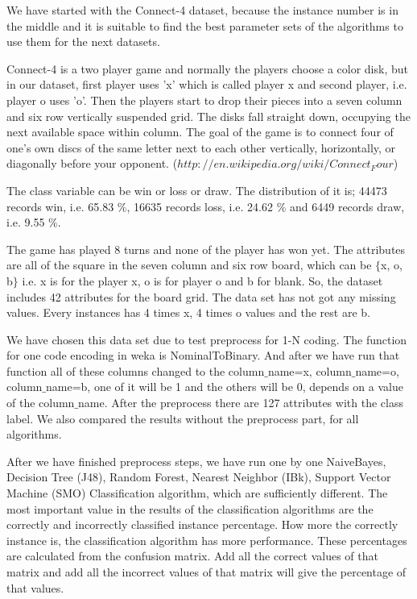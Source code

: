 \documentclass[a4paper]{article}
\begin{document}
We have started with the Connect-4 dataset, because the instance number is in the middle and it is suitable to find the best parameter sets of the algorithms to use them for the next datasets.

Connect-4 is a two player game and normally the players choose a color disk, but in our dataset, first player uses 'x' which is called player x and second player, i.e. player o uses 'o'. Then the players start to drop their pieces into a seven column and six row vertically suspended grid. The disks fall straight down, occupying the next available space within column. The goal of the game is to connect four of one's own discs of the same letter next to each other vertically, horizontally, or diagonally before your opponent. ($http://en.wikipedia.org/wiki/Connect_Four$) 

The class variable can be win or loss or draw. The distribution of it is; 44473 records win, i.e. 65.83 $\%$, 16635 records loss,  i.e. 24.62 $\%$ and 6449 records draw,  i.e. 9.55 $\%$.

The game has played 8 turns and none of the player has won yet. The attributes are all of the square in the seven column and six row board, which can be $\{$x, o, b$\}$ i.e. x is for the player x, o is for player o and b for blank. So, the dataset includes 42 attributes for the board grid. The data set has not got any missing values. Every instances has 4 times x, 4 times o values and the rest are b. 

We have chosen this data set due to test preprocess for 1-N coding. The function for one code encoding in weka is NominalToBinary. And after we have run that function all of these columns changed to the column$\_$name=x, column$\_$name=o, column$\_$name=b, one of it will be 1 and the others will be 0, depends on a value of the column$\_$name. After the preprocess there are 127 attributes with the class label. We also compared the results without the preprocess part, for all algorithms.

After we have finished preprocess steps, we have run one by one NaiveBayes, Decision Tree (J48), Random Forest, Nearest Neighbor (IBk), Support Vector Machine (SMO) Classification algorithm, which are sufficiently different. The most important value in the results of the classification algorithms are the correctly and incorrectly classified instance percentage. How more the correctly instance is, the classification algorithm has more performance. These percentages are calculated from the confusion matrix. Add all the correct values of that matrix and add all the incorrect values of that matrix will give the percentage of that values. 
\end{document}

